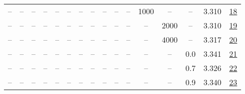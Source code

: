 \begin{table}[H]
\begin{tabular}{cccccccccccccccc}
-- & -- & -- & -- & -- & -- & -- & -- & -- & -- & -- & 1000 & -- & -- & 3.310 & \href{https://wandb.ai/stanford-mercury/optimizer-scaling/runs/sweep-130m-10B-kron2c6da9lr0.002-wd0.5-b10.95-plr0.2-pis1-gn1-no-f705c8}{18} \\
-- & -- & -- & -- & -- & -- & -- & -- & -- & -- & -- & -- & 2000 & -- & 3.310 & \href{https://wandb.ai/stanford-mercury/optimizer-scaling/runs/sweep-130m-10B-kron7e7565lr0.002-wd0.5-b10.95-plr0.2-pis1-gn1-no-5425b1}{19} \\
-- & -- & -- & -- & -- & -- & -- & -- & -- & -- & -- & -- & 4000 & -- & 3.317 & \href{https://wandb.ai/stanford-mercury/optimizer-scaling/runs/sweep-130m-10B-kron35a609lr0.002-wd0.5-b10.95-plr0.2-pis1-gn1-no-42f16b}{20} \\
-- & -- & -- & -- & -- & -- & -- & -- & -- & -- & -- & -- & -- & 0.0 & 3.341 & \href{https://wandb.ai/stanford-mercury/optimizer-scaling/runs/sweep-130m-10B-kronf6cdb4lr0.002-wd0.0-b10.95-plr0.2-pis1-gn1-no-aeed18}{21} \\
-- & -- & -- & -- & -- & -- & -- & -- & -- & -- & -- & -- & -- & 0.7 & 3.326 & \href{https://wandb.ai/stanford-mercury/optimizer-scaling/runs/sweep-130m-10B-kroncf91b2lr0.002-wd0.7-b10.95-plr0.2-pis1-gn1-no-bb43f6}{22} \\
-- & -- & -- & -- & -- & -- & -- & -- & -- & -- & -- & -- & -- & 0.9 & 3.340 & \href{https://wandb.ai/stanford-mercury/optimizer-scaling/runs/sweep-130m-10B-kron5e6407lr0.002-wd0.9-b10.95-plr0.2-pis1-gn1-no-8578c1}{23} \\
\bottomrule
\end{tabular}
\end{table}

